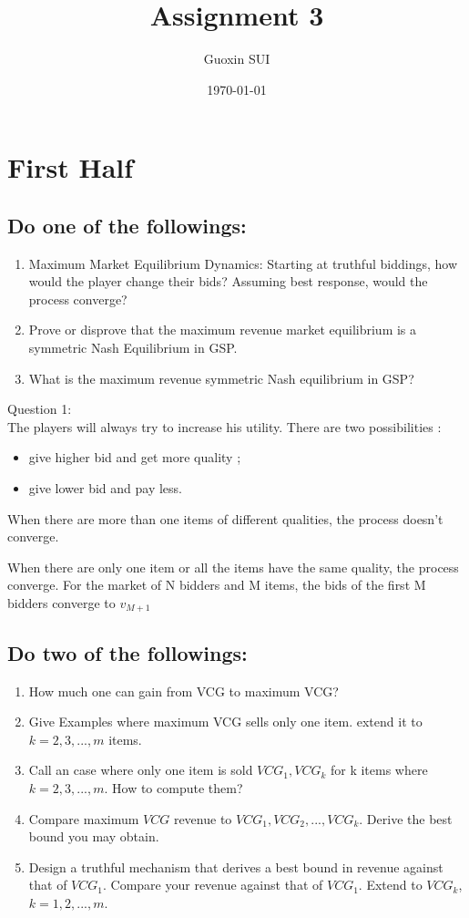 \documentclass{article}
\title{Assignment 3}
\author{Guoxin SUI}
\date{\today}
\newenvironment{answer}{\par\color{ForestGreen}}{\par}
\begin{document}
\maketitle

\section{First Half}
\subsection{Do one of the followings:}
\begin{enumerate}
    \item
    Maximum Market Equilibrium Dynamics: Starting at truthful biddings,
    how would the player change their bids? Assuming best response, would the process converge?
    \item
    Prove or disprove that the maximum revenue market equilibrium is a symmetric Nash Equilibrium in GSP.
    \item
    What is the maximum revenue symmetric Nash equilibrium in GSP?
\end{enumerate}

\begin{answer}
Question 1: \\
The players will always try to increase his utility. There are two possibilities :
  \begin{itemize}
  \item give higher bid and get more quality ;
  \item give lower bid and pay less.
  \end{itemize}
  When there are more than one items of different qualities, the process doesn't converge.

  When there are only one item or all the items have the same quality, the process converge. For the market of N bidders and M items, the bids of the first M bidders converge to $v_{M+1}$
\end{answer}

\subsection{Do two of the followings:}
\begin{enumerate}
    \item
    How much one can gain from VCG to maximum VCG?
    \item
    Give Examples where maximum VCG sells only one item. extend it to $k = 2,3,... ,m$ items.
    \item
    Call an case where only one item is sold $VCG_1, VCG_k$ for k items where $k = 2,3,... ,m.$ How to compute them?
    \item
    Compare maximum $VCG$ revenue to $VCG_1, VCG_2,... ,VCG_k$. Derive the best bound you may obtain.
    \item
    Design a truthful mechanism that derives a best bound in revenue against that of $VCG_1$.
    Compare your revenue against that of $VCG_1$. Extend to $VCG_k$, $k = 1,2,... ,m$.
\end{enumerate}
\end{document}

